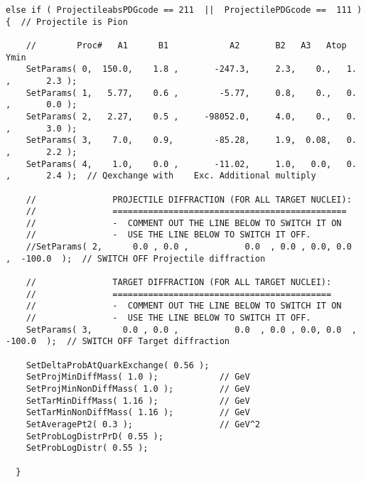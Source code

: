 \begin{lstlisting}
else if ( ProjectileabsPDGcode == 211  ||  ProjectilePDGcode ==  111 ) {  // Projectile is Pion 

    //        Proc#   A1      B1            A2       B2   A3   Atop       Ymin
    SetParams( 0,  150.0,    1.8 ,       -247.3,     2.3,    0.,   1. ,       2.3 );
    SetParams( 1,   5.77,    0.6 ,        -5.77,     0.8,    0.,   0. ,       0.0 );
    SetParams( 2,   2.27,    0.5 ,     -98052.0,     4.0,    0.,   0. ,       3.0 ); 
    SetParams( 3,    7.0,    0.9,        -85.28,     1.9,  0.08,   0. ,       2.2 );
    SetParams( 4,    1.0,    0.0 ,       -11.02,     1.0,   0.0,   0. ,       2.4 );  // Qexchange with    Exc. Additional multiply

    //               PROJECTILE DIFFRACTION (FOR ALL TARGET NUCLEI):
    //               ==============================================
    //               -  COMMENT OUT THE LINE BELOW TO SWITCH IT ON
    //               -  USE THE LINE BELOW TO SWITCH IT OFF.
    //SetParams( 2,      0.0 , 0.0 ,           0.0  , 0.0 , 0.0, 0.0  ,  -100.0  );  // SWITCH OFF Projectile diffraction

    //               TARGET DIFFRACTION (FOR ALL TARGET NUCLEI): 
    //               ===========================================
    //               -  COMMENT OUT THE LINE BELOW TO SWITCH IT ON
    //               -  USE THE LINE BELOW TO SWITCH IT OFF.
    SetParams( 3,      0.0 , 0.0 ,           0.0  , 0.0 , 0.0, 0.0  ,  -100.0  );  // SWITCH OFF Target diffraction
    
    SetDeltaProbAtQuarkExchange( 0.56 );
    SetProjMinDiffMass( 1.0 );            // GeV
    SetProjMinNonDiffMass( 1.0 );         // GeV 
    SetTarMinDiffMass( 1.16 );            // GeV
    SetTarMinNonDiffMass( 1.16 );         // GeV
    SetAveragePt2( 0.3 );                 // GeV^2
    SetProbLogDistrPrD( 0.55 );
    SetProbLogDistr( 0.55 );

  }
\end{lstlisting}

